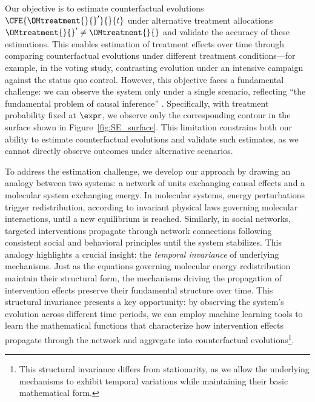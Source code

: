 Our objective is to estimate counterfactual evolutions $\CFE{\OMtreatment{}{}'}{}{t}$ under alternative treatment allocations $\OMtreatment{}{}' \neq \OMtreatment{}{}$ and validate the accuracy of these estimations. This enables estimation of treatment effects over time through comparing counterfactual evolutions under different treatment conditions—for example, in the voting study, contrasting evolution under an intensive campaign against the status quo control. However, this objective faces a fundamental challenge: we can observe the system only under a single scenario, reflecting ``the fundamental problem of causal inference'' \citep{holland1986statistics}. Specifically, with treatment probability fixed at $\expr$, we observe only the corresponding contour in the surface shown in Figure~\ref{fig:SE_surface}. This limitation constrains both our ability to estimate counterfactual evolutions and validate such estimates, as we cannot directly observe outcomes under alternative scenarios.

To address the estimation challenge, we develop our approach by drawing an analogy between two systems: a network of units exchanging causal effects and a molecular system exchanging energy. In molecular systems, energy perturbations trigger redistribution, according to invariant physical laws governing molecular interactions, until a new equilibrium is reached. Similarly, in social networks, targeted interventions propagate through network connections following consistent social and behavioral principles until the system stabilizes. This analogy highlights a crucial insight: the \emph{temporal invariance} of underlying mechanisms. Just as the equations governing molecular energy redistribution maintain their structural form, the mechanisms driving the propagation of intervention effects preserve their fundamental structure over time. This structural invariance presents a key opportunity: by observing the system's evolution across different time periods, we can employ machine learning tools to learn the mathematical functions that characterize how intervention effects propagate through the network and aggregate into counterfactual evolutions\footnote{This structural invariance differs from stationarity, as we allow the underlying mechanisms to exhibit temporal variations while maintaining their basic mathematical form.}.


